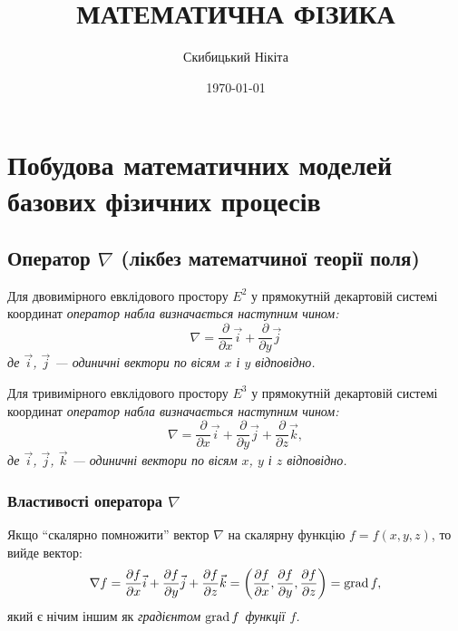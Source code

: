 

\title{{\Huge МАТЕМАТИЧНА ФІЗИКА}}
\author{Скибицький Нікіта}
\date{\today}




\tableofcontents

\setcounter{section}{2}

\section{Побудова математичних моделей базових фізичних процесів}

\setcounter{subsection}{-1}
\subsection{Оператор \texorpdfstring{$\nabla$}{nabla} (лікбез математчиної теорії поля)}

\begin{definition}
    Для двовимірного евклідового простору $E^2$ у прямокутній декартовій системі координат \it{оператор набла} визначається наступним чином:
    \begin{equation}
    	\nabla = \frac{\partial}{\partial x} \vec{i} + \frac{\partial}{\partial y} \vec{j}
    \end{equation}
    де $\vec{i}$, $\vec{j}$ --- одиничні вектори по вісям $x$ і $y$ відповідно.
\end{definition}

\begin{definition}
    Для тривимірного евклідового простору $E^3$ у прямокутній декартовій системі координат \it{оператор набла} визначається наступним чином:
    \begin{equation}
    	\nabla = \frac{\partial}{\partial x} \vec{i} + \frac{\partial}{\partial y} \vec{j} + \frac{\partial}{\partial z} \vec{k},
    \end{equation}
    де $\vec{i}$, $\vec{j}$, $\vec{k}$ --- одиничні вектори по вісям $x$, $y$ і $z$ відповідно.
\end{definition}

\subsubsection{Властивості оператора \texorpdfstring{$\nabla$}{nabla}}

\begin{definition}
	Якщо ``скалярно помножити'' вектор $\nabla$ на скалярну функцію $f = f(x, y, z)$, то вийде вектор:
	\begin{equation}
    	\nabla f = \frac{\partial f}{\partial x} \vec{i} + \frac{\partial f}{\partial y} \vec{j} + \frac{\partial f}{\partial z} \vec{k} = \left( \frac{\partial f}{\partial x}, \frac{\partial f}{\partial y}, \frac{\partial f}{\partial z} \right) = \operatorname{grad} f,
    \end{equation}
    який є нічим іншим як \it{градієнтом} $\operatorname{grad} f$ функції $f$.
\end{definition}

